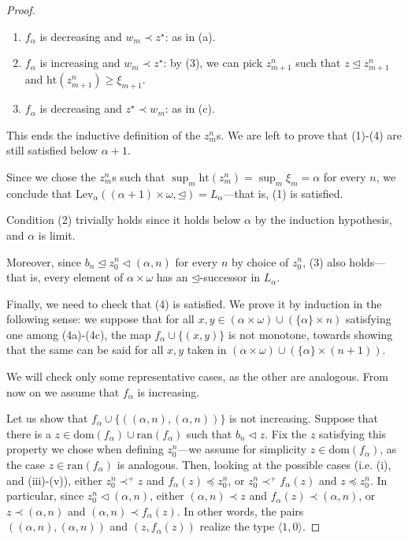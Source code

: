 \documentclass[10pt,a4paper]{amsart}
\begin{document}
\begin{proof}
\begin{enumerate}[label={(\alph*)}]
\item $f_\alpha$ is decreasing and $w_m \prec z^\star$:
\newline as in (a).

\item $f_\alpha$ is increasing and $w_m \prec z^\star$:
\newline by (3), we can pick $z_{m+1}^n$ such that $z \unlhd z_{m+1}^n$ and $\mathrm{ht}(z_{m+1}^n) \ge \xi_{m+1}$.


\item $f_\alpha$ is decreasing and $z^\star \prec w_m$:
\newline as in (c).
\end{enumerate}


This ends the inductive definition of the $z_m^n$s. We are left to prove that (1)-(4) are still satisfied below $\alpha+1$. 

Since we chose the $z_m^n$s such that $\sup_m \mathrm{ht}(z_m^n) = \sup_m \xi_m = \alpha$ for every $n$, we conclude that $\mathrm{Lev}_\alpha((\alpha+1)\times \omega, \unlhd) = L_\alpha$---that is, (1) is satisfied. 

Condition (2) trivially holds since it holds below $\alpha$ by the induction hypothesis, and $\alpha$ is limit.

Moreover, since $b_n \unlhd z_0^n \lhd (\alpha, n)$ for every $n$ by choice of $z_0^n$, (3) also holds---that is, every element of $\alpha\times \omega$ has an $\unlhd$-successor in $L_\alpha$.  


Finally, we need to check that (4) is satisfied. We prove it by induction in the following sense: we suppose that for all $x,y \in (\alpha \times \omega) \cup (\{\alpha\} \times n)$ satisfying one among (4a)-(4c), the map $f_\alpha \cup \{(x,y)\}$ is not monotone, towards showing that the same can be said for all $x,y$ taken in $(\alpha \times \omega) \cup (\{\alpha\} \times (n+1))$.

We will check only some representative cases, as the other are analogous. From now on we assume that $f_\alpha$ is increasing.

Let us show that $f_\alpha \cup \{((\alpha, n), (\alpha, n))\}$ is not increasing.  Suppose that there is a $z \in \mathrm{dom}(f_\alpha) \cup \mathrm{ran}(f_\alpha)$ such that  $b_n \lhd z$. Fix the $z$ satisfying this property we chose when defining $z_0^n$---we assume for simplicity $z \in \mathrm{dom}(f_\alpha)$, as the case $z \in \mathrm{ran}(f_\alpha)$ is analogous. Then, looking at the possible cases (i.e. (i), and (iii)-(v)), either $z_0^n \prec^+ z$ and $f_\alpha(z) \preceq z_0^n$, or $z_0^n \prec^+ f_\alpha(z)$ and $z \preceq z_0^n$. In particular, since $z_0^n \lhd (\alpha, n)$, either $(\alpha, n) \prec z$ and $f_\alpha(z) \prec (\alpha, n)$, or $z \prec (\alpha, n)$ and $(\alpha, n) \prec f_\alpha(z)$. In other words, the pairs $((\alpha, n), (\alpha, n))$ and $(z, f_\alpha(z))$ realize the type $\langle 1,0\rangle$. 


\end{proof}
\end{document}
